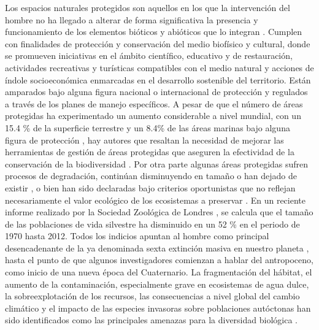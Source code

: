 \documentclass[onecolumn]{extarticle}
\begin{document}
Los espacios naturales protegidos son aquellos en los que la
intervención del hombre no ha llegado a alterar de forma significativa
la presencia y funcionamiento de los elementos bióticos y abióticos que
lo integran \citep{Bravo2008}. Cumplen con finalidades de protección y
conservación del medio biofísico y cultural, donde se promueven
iniciativas en el ámbito científico, educativo y de restauración,
actividades recreativas y turísticas compatibles con el medio natural y
acciones de índole socioeconómica enmarcadas en el desarrollo sostenible
del territorio. Están amparados bajo alguna figura nacional o
internacional de protección y regulados a través de los planes de manejo
específicos. A pesar de que el número de áreas protegidas ha
experimentado un aumento considerable a nivel mundial, con un 15.4 \% de
la superficie terrestre y un 8.4\% de las áreas marinas bajo alguna
figura de protección \citep{juffe2014protected} , hay autores que
resaltan la necesidad de mejorar las herramientas de gestión de áreas
protegidas que aseguren la efectividad de la conservación de la
biodiversidad \citep{Chape2005}. Por otra parte algunas áreas protegidas
sufren procesos de degradación, continúan disminuyendo en tamaño o han
dejado de existir \citep{Mascia2011}, o bien han sido declaradas bajo
criterios oportunistas que no reflejan necesariamente el valor ecológico
de los ecosistemas a preservar \citep{Knight2007}. En un reciente
informe realizado por la Sociedad Zoológica de Londres
\citep{Living2016} , se calcula que el tamaño de las poblaciones de vida
silvestre ha disminuido en un 52 \% en el periodo de 1970 hasta 2012.
Todos los indicios apuntan al hombre como principal desencadenante de la
ya denominada sexta extinción masiva en nuestro planeta
\citep{Barnosky2011}, hasta el punto de que algunos investigadores
comienzan a hablar del antropoceno, como inicio de una nueva época del
Cuaternario. La fragmentación del hábitat, el aumento de la
contaminación, especialmente grave en ecosistemas de agua dulce, la
sobreexplotación de los recursos, las consecuencias a nivel global del
cambio climático y el impacto de las especies invasoras sobre
poblaciones autóctonas han sido identificados como las principales
amenazas para la diversidad biológica \citep{Conabio2017}.
\end{document}
